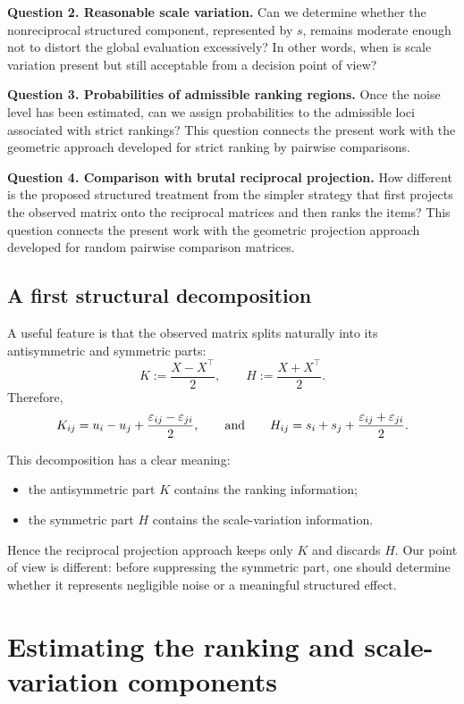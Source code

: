 \documentclass[11pt]{amsart}
\theoremstyle{definition}
\theoremstyle{plain}
\numberwithin{equation}{section}
\begin{document}
\noindent\textbf{Question 2. Reasonable scale variation.}
Can we determine whether the nonreciprocal structured component, represented by $s$, remains moderate enough not to distort the global evaluation excessively? In other words, when is scale variation present but still acceptable from a decision point of view?

\medskip

\noindent\textbf{Question 3. Probabilities of admissible ranking regions.}
Once the noise level has been estimated, can we assign probabilities to the admissible loci associated with strict rankings? This question connects the present work with the geometric approach developed for strict ranking by pairwise comparisons.

\medskip

\noindent\textbf{Question 4. Comparison with brutal reciprocal projection.}
How different is the proposed structured treatment from the simpler strategy that first projects the observed matrix onto the reciprocal matrices and then ranks the items? This question connects the present work with the geometric projection approach developed for random pairwise comparison matrices.

\subsection{A first structural decomposition}

A useful feature  is that the observed matrix splits naturally into its antisymmetric and symmetric parts:
\[
K:=\frac{X-X^\top}{2},
\qquad
H:=\frac{X+X^\top}{2}.
\]
Therefore,
\[
K_{ij}=u_i-u_j+\frac{\varepsilon_{ij}-\varepsilon_{ji}}{2},
\qquad 
\hbox{and}
\qquad
H_{ij}=s_i+s_j+\frac{\varepsilon_{ij}+\varepsilon_{ji}}{2}.
\]

This decomposition has a clear meaning:
\begin{itemize}
\item the antisymmetric part $K$ contains the ranking information;
\item the symmetric part $H$ contains the scale-variation information.
\end{itemize}

Hence the reciprocal projection approach keeps only $K$ and discards $H$. Our point of view is different: before suppressing the symmetric part, one should determine whether it represents negligible noise or a meaningful structured effect.



\section{Estimating the ranking and scale-variation components}
\end{document}
